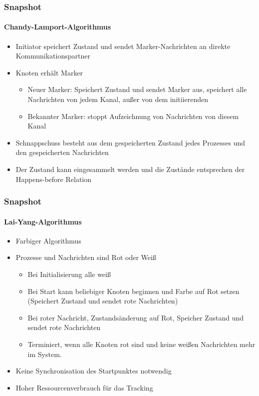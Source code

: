 \begin{frame}
  \frametitle{Snapshot}
  \framesubtitle{Chandy-Lamport-Algorithmus}
  \begin{itemize}
    \item Initiator speichert Zustand und sendet Marker-Nachrichten an direkte Kommunikationspartner
    \item Knoten erhält Marker
      \begin{itemize}
      \item Neuer Marker: Speichert Zustand und sendet Marker aus, speichert alle Nachrichten von jedem Kanal, außer von dem initiierenden
      \item Bekannter Marker: stoppt Aufzeichnung von Nachrichten von diesem Kanal
     \end{itemize}
    \item Schnappschuss besteht aus dem gespeicherten Zustand jedes Prozesses und den gespeicherten Nachrichten
    \item Der Zustand kann eingesammelt werden und die Zustände entsprechen der Happens-before Relation
  \end{itemize}
\end{frame}


\begin{frame}
  \frametitle{Snapshot}
  \framesubtitle{Lai-Yang-Algorithmus}
  \begin{itemize}
    \item Farbiger Algorithmus 
    \item Prozesse und Nachrichten sind Rot oder Weiß
      \begin{itemize}
      \item Bei Initialisierung alle weiß
      \item Bei Start kann beliebiger Knoten beginnen und Farbe auf Rot setzen (Speichert Zustand und sendet rote Nachrichten)
      \item Bei roter Nachricht, Zustandsänderung auf Rot, Speicher Zustand und sendet rote Nachrichten
      \item Terminiert, wenn alle Knoten rot sind und keine weißen Nachrichten mehr im System.
     \end{itemize}
     \item Keine Synchronisation des Startpunktes notwendig
     \item Hoher Ressourcenverbrauch für das Tracking
  \end{itemize}
\end{frame}


